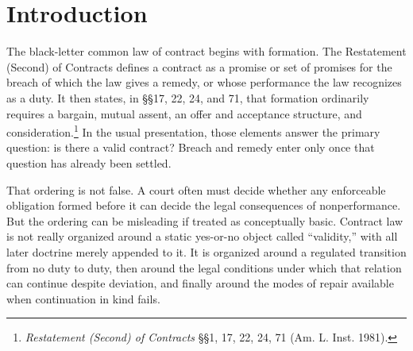 \documentclass[11pt]{article}
\begin{document}
\maketitle
\begin{abstract}
Classical contract doctrine is usually taught in two stages. First comes formation: offer, acceptance, and consideration establish whether a contract exists. Only afterward come breach and remedy. That sequence is pedagogically convenient, but it obscures the deeper structure of the field. The better reading is that formation rules are an admissibility gate on the creation of binding obligation; material breach marks an inadmissible attempted continuation of that obligation; and remedies are repair operators that specify how the legal relationship can still go on once performance has failed. Expectation damages, in particular, are not best understood as merely downstream bookkeeping. They preserve the future the contract licensed. By contrast, reliance, restitution, and rescission preserve different invariants, and some doctrinal zones --- especially rescission for fraud or mutual mistake --- expose the limits of the repair framing by aiming to unwind the transaction as though the original transition should never have counted. Read this way, contract law sits naturally beside the admissibility-centered picture developed in \textit{Contradiction and Continuation}, while still retaining the doctrinal details that make contract law a legal practice rather than a metaphor.
\end{abstract}

\section{Introduction}
The black-letter common law of contract begins with formation. The Restatement (Second) of Contracts defines a contract as a promise or set of promises for the breach of which the law gives a remedy, or whose performance the law recognizes as a duty. It then states, in \S\S 17, 22, 24, and 71, that formation ordinarily requires a bargain, mutual assent, an offer and acceptance structure, and consideration.\footnote{\textit{Restatement (Second) of Contracts} \S\S 1, 17, 22, 24, 71 (Am. L. Inst. 1981).} In the usual presentation, those elements answer the primary question: is there a valid contract? Breach and remedy enter only once that question has already been settled.

That ordering is not false. A court often must decide whether any enforceable obligation formed before it can decide the legal consequences of nonperformance. But the ordering can be misleading if treated as conceptually basic. Contract law is not really organized around a static yes-or-no object called ``validity,'' with all later doctrine merely appended to it. It is organized around a regulated transition from no duty to duty, then around the legal conditions under which that relation can continue despite deviation, and finally around the modes of repair available when continuation in kind fails.
\end{document}
